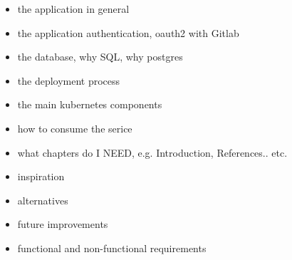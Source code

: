\documentclass[../masters-thesis.tex]{subfiles}
\begin{document}
\begin{itemize}
    \item the application in general
    \item the application authentication, oauth2 with Gitlab
    \item the database, why SQL, why postgres
    \item the deployment process
    \item the main kubernetes components
    \item how to consume the serice
    \item what chapters do I NEED, e.g. Introduction, References.. etc.
    \item inspiration
    \item alternatives
    \item future improvements
    \item functional and non-functional requirements
\end{itemize}
\end{document}

